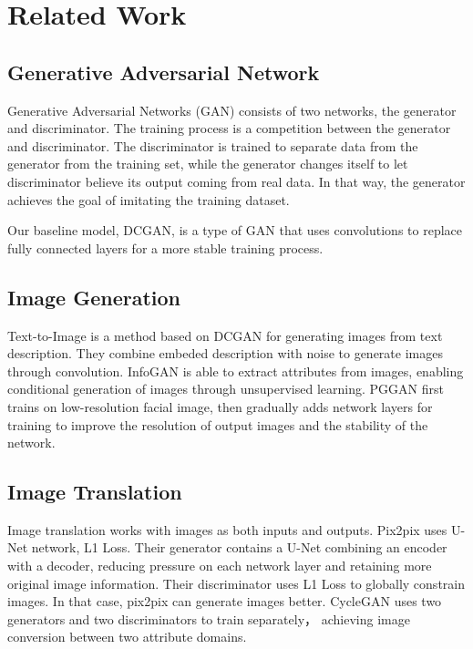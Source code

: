 \section{Related Work}


\subsection{Generative Adversarial Network}
Generative Adversarial Networks (GAN) consists of two networks, the generator and discriminator.
The training process is a competition between the generator and discriminator.
The discriminator is trained to separate data from the generator from the training set,
    while the generator changes itself to let discriminator believe its output coming from real data.
In that way, the generator achieves the goal of imitating the training dataset.

Our baseline model, DCGAN, is a type of GAN that uses convolutions to replace fully connected layers for a more stable training process.


\subsection{Image Generation}

Text-to-Image is a method based on DCGAN for generating images from text description.
They combine embeded description with noise to generate images through convolution.
InfoGAN is able to extract attributes from images, enabling conditional generation of images through unsupervised learning.
PGGAN first trains on low-resolution facial image, then gradually adds network layers for training to improve the resolution of output images and the stability of the network.

\subsection{Image Translation}
Image translation works with images as both inputs and outputs.
Pix2pix uses U-Net network, L1 Loss.
Their generator contains a U-Net combining an encoder with a decoder,
    reducing pressure on each network layer and retaining more original image information.
Their discriminator uses L1 Loss to globally constrain images.
In that case, pix2pix can generate images better.
CycleGAN uses two generators and two discriminators to train separately， achieving image conversion between two attribute domains.

